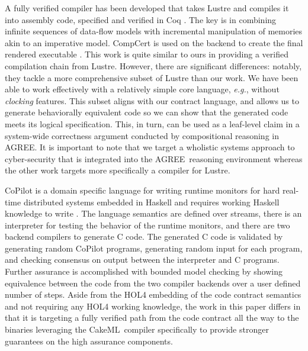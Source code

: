 \documentclass[global,twocolumn]{svjour}
\newcommand{\agr}{AGREE}
\newcommand{\ckml}{CakeML}
\newcommand{\eg}{\textit{e.g.}}
\begin{document}
A fully verified compiler has been developed that takes Lustre and compiles it into assembly code, specified and verified in Coq \cite{10.1145/3140587.3062358}.
%
The key is in combining infinite sequences of data-flow models with incremental manipulation of memories akin to an imperative model.
%
CompCert is used on the backend to create the final rendered executable \cite{compcert}.
%
This work is quite similar to ours in providing a verified compilation chain from Lustre.
%
However, there are significant differences: notably, they tackle a more comprehensive subset of Lustre than our work.
%
We have been able to work effectively with a relatively simple core language, \eg, without \emph{clocking} features.
%
This subset aligns with our contract language, and allows us to generate behaviorally equivalent code so we can show that the generated code meets its logical specification.
%
This, in turn, can be used as a leaf-level claim in a system-wide correctness argument conducted by compositional reasoning in \agr.
%
It is important to note that we target a wholistic systems approach to cyber-security that is integrated into the \agr\ reasoning environment whereas the other work targets more specifically a compiler for Lustre.

CoPilot is a domain specific language for writing runtime monitors for hard real-time distributed systems embedded in Haskell and requires working Haskell knowledge to write \cite{10.1007/s11334-013-0223-x}.
%
The language semantics are defined over streams, there is an interpreter for testing the behavior of the runtime monitors, and there are two backend compilers to generate C code.
%
The generated C code is validated by generating random CoPilot programs, generating random input for each program, and checking consensus on output between the interpreter and C programs.
%
Further assurance is accomplished with bounded model checking by showing equivalence between the code from the two compiler backends over a user defined number of steps.
%
Aside from the HOL4 embedding of the code contract semantics and not requiring any HOL4 working knowledge, the work in this paper differs in that it is targeting a fully verified path from the code contract all the way to the binaries leveraging the \ckml\ compiler specifically to provide stronger guarantees on the high assurance components.
\end{document}
